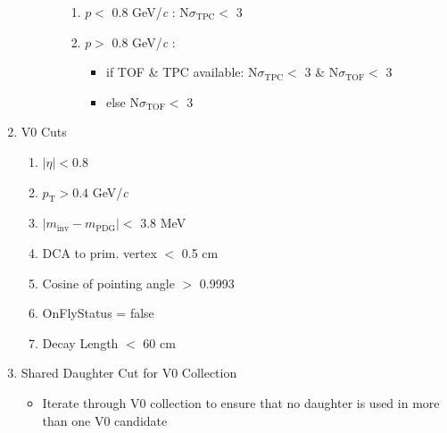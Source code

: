 \documentclass[../AnalysisNoteJBuxton.tex]{subfiles}
\begin{document}
\begin{enumerate}
\begin{enumerate}
\begin{enumerate}
\begin{enumerate}
    \item $p <$ 0.8 GeV/\textit{c} : N$\sigma_{\mathrm{TPC}} <$ 3
    \item $p >$ 0.8 GeV/\textit{c} :
    \begin{itemize}
     \item if TOF \& TPC available: N$\sigma_{\mathrm{TPC}} <$ 3 \& N$\sigma_{\mathrm{TOF}} <$ 3
     \item else N$\sigma_{\mathrm{TOF}} <$ 3
    \end{itemize}
   \end{enumerate}   
  \end{enumerate}
 \end{enumerate}
 \item V0 Cuts
 \begin{enumerate}
  \item $|\eta| < 0.8$
  \item $p_{\mathrm{T}} > 0.4$ GeV/\textit{c}
  \item $|m_{\mathrm{inv}} - m_{\mathrm{PDG}}| <$ 3.8 MeV
  \item DCA to prim. vertex $<$ 0.5 cm
  \item Cosine of pointing angle $>$ 0.9993
  \item OnFlyStatus = false
  \item Decay Length $<$ 60 cm
 \end{enumerate}
 \item Shared Daughter Cut for V0 Collection
 \begin{itemize}
  \item Iterate through V0 collection to ensure that no daughter is used in more than one V0 candidate
 \end{itemize}
\end{enumerate} 
\end{document}
